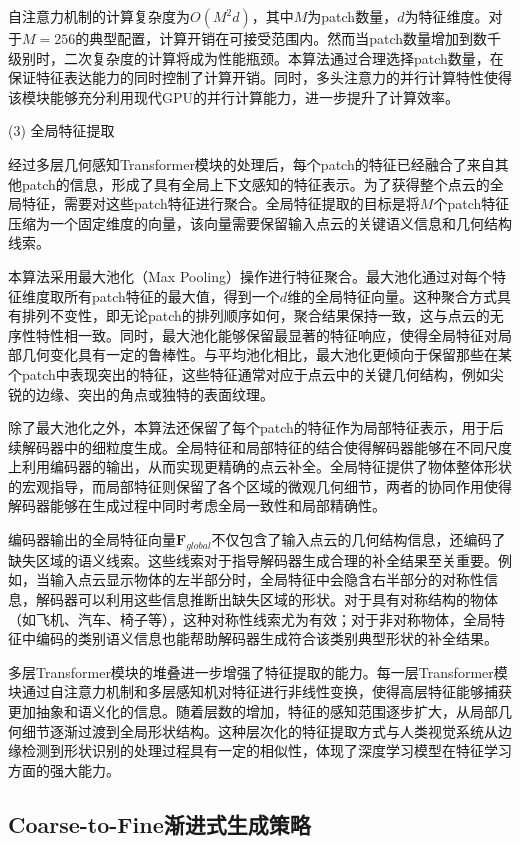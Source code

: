 自注意力机制的计算复杂度为$O(M^2 d)$，其中$M$为patch数量，$d$为特征维度。对于$M=256$的典型配置，计算开销在可接受范围内。然而当patch数量增加到数千级别时，二次复杂度的计算将成为性能瓶颈。本算法通过合理选择patch数量，在保证特征表达能力的同时控制了计算开销。同时，多头注意力的并行计算特性使得该模块能够充分利用现代GPU的并行计算能力，进一步提升了计算效率。

(3) 全局特征提取

经过多层几何感知Transformer模块的处理后，每个patch的特征已经融合了来自其他patch的信息，形成了具有全局上下文感知的特征表示。为了获得整个点云的全局特征，需要对这些patch特征进行聚合。全局特征提取的目标是将$M$个patch特征压缩为一个固定维度的向量，该向量需要保留输入点云的关键语义信息和几何结构线索。

本算法采用最大池化（Max Pooling）操作进行特征聚合。最大池化通过对每个特征维度取所有patch特征的最大值，得到一个$d$维的全局特征向量。这种聚合方式具有排列不变性，即无论patch的排列顺序如何，聚合结果保持一致，这与点云的无序性特性相一致。同时，最大池化能够保留最显著的特征响应，使得全局特征对局部几何变化具有一定的鲁棒性。与平均池化相比，最大池化更倾向于保留那些在某个patch中表现突出的特征，这些特征通常对应于点云中的关键几何结构，例如尖锐的边缘、突出的角点或独特的表面纹理。

除了最大池化之外，本算法还保留了每个patch的特征作为局部特征表示，用于后续解码器中的细粒度生成。全局特征和局部特征的结合使得解码器能够在不同尺度上利用编码器的输出，从而实现更精确的点云补全。全局特征提供了物体整体形状的宏观指导，而局部特征则保留了各个区域的微观几何细节，两者的协同作用使得解码器能够在生成过程中同时考虑全局一致性和局部精确性。

编码器输出的全局特征向量$\mathbf{F}_{global}$不仅包含了输入点云的几何结构信息，还编码了缺失区域的语义线索。这些线索对于指导解码器生成合理的补全结果至关重要。例如，当输入点云显示物体的左半部分时，全局特征中会隐含右半部分的对称性信息，解码器可以利用这些信息推断出缺失区域的形状。对于具有对称结构的物体（如飞机、汽车、椅子等），这种对称性线索尤为有效；对于非对称物体，全局特征中编码的类别语义信息也能帮助解码器生成符合该类别典型形状的补全结果。

多层Transformer模块的堆叠进一步增强了特征提取的能力。每一层Transformer模块通过自注意力机制和多层感知机对特征进行非线性变换，使得高层特征能够捕获更加抽象和语义化的信息。随着层数的增加，特征的感知范围逐步扩大，从局部几何细节逐渐过渡到全局形状结构。这种层次化的特征提取方式与人类视觉系统从边缘检测到形状识别的处理过程具有一定的相似性，体现了深度学习模型在特征学习方面的强大能力。

\subsection{Coarse-to-Fine渐进式生成策略}

